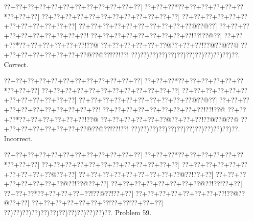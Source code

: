 \documentclass[a5paper]{article}
\begin{document}
\begin{center}
{\goo
\0??+\0??+\0??+\0??+\0??+\0??+\0??+\0??+\0??+\0??+\0??+\0??]
\0??+\0??+\0??*\0??+\0??+\0??+\0??+\0??+\0??*\0??+\0??+\0??]
\0??+\0??+\0??+\0??+\0??+\0??+\0??+\0??+\0??+\0??+\0??+\0??]
\0??+\0??+\0??+\0??+\0??+\0??+\0??+\0??+\0??+\0??+\0??+\0??]
\0??+\0??+\0??+\0??+\0??+\0??+\0??+\0??+\0??+\0??@\0??@\0??]
\0??+\0??+\0??+\0??+\0??+\0??+\0??+\0??+\0??+\0??!
\0??+\0??+\0??+\0??+\0??+\0??+\0??+\0??+\0??!\0??!\0??@\0??]
\0??+\0??+\0??*\0??+\0??+\0??+\0??+\0??+\0??!\0??@
\0??+\0??+\0??+\0??+\0??+\0??@\0??+\0??+\0??!\0??@\0??@\0??@
\0??+\0??+\0??+\0??+\0??+\0??+\0??+\0??@\0??@\0??!\0??!\0??!
\0??)\0??)\0??)\0??)\0??)\0??)\0??)\0??)\0??)\0??)\0??)\0??.
}
Correct. 

\end{center}
\begin{center}
{\goo
\0??+\0??+\0??+\0??+\0??+\0??+\0??+\0??+\0??+\0??+\0??+\0??]
\0??+\0??+\0??*\0??+\0??+\0??+\0??+\0??+\0??*\0??+\0??+\0??]
\0??+\0??+\0??+\0??+\0??+\0??+\0??+\0??+\0??+\0??+\0??+\0??]
\0??+\0??+\0??+\0??+\0??+\0??+\0??+\0??+\0??+\0??+\0??+\0??]
\0??+\0??+\0??+\0??+\0??+\0??+\0??+\0??+\0??+\0??@\0??@\0??]
\0??+\0??+\0??+\0??+\0??+\0??+\0??+\0??+\0??+\0??+\0??!
\0??+\0??+\0??+\0??+\0??+\0??+\0??+\0??+\0??!\0??!\0??@
\0??+\0??+\0??*\0??+\0??+\0??+\0??+\0??+\0??!\0??@
\0??+\0??+\0??+\0??+\0??+\0??@\0??+\0??+\0??!\0??@\0??@\0??@
\0??+\0??+\0??+\0??+\0??+\0??+\0??+\0??@\0??@\0??!\0??!\0??!
\0??)\0??)\0??)\0??)\0??)\0??)\0??)\0??)\0??)\0??)\0??)\0??.
}
Incorrect. 

\end{center}
\newpage
\begin{center}
{\goo
\0??+\0??+\0??+\0??+\0??+\0??+\0??+\0??+\0??+\0??+\0??+\0??]
\0??+\0??+\0??*\0??+\0??+\0??+\0??+\0??+\0??*\0??+\0??+\0??]
\0??+\0??+\0??+\0??+\0??+\0??+\0??+\0??+\0??+\0??+\0??+\0??]
\0??+\0??+\0??+\0??+\0??+\0??+\0??+\0??+\0??+\0??@\0??+\0??]
\0??+\0??+\0??+\0??+\0??+\0??+\0??+\0??+\0??@\0??!\0??+\0??]
\0??+\0??+\0??+\0??+\0??+\0??+\0??+\0??@\0??!\0??@\0??+\0??]
\0??+\0??+\0??+\0??+\0??+\0??+\0??+\0??@\0??!\0??!\0??+\0??]
\0??+\0??+\0??*\0??+\0??+\0??+\0??+\0??!\0??@\0??!\0??+\0??]
\0??+\0??+\0??+\0??+\0??+\0??+\0??+\0??!\0??@\0??@\0??+\0??]
\0??+\0??+\0??+\0??+\0??+\0??+\0??!\0??+\0??!\0??+\0??+\0??]
\0??)\0??)\0??)\0??)\0??)\0??)\0??)\0??)\0??)\0??)\0??)\0??.
}
Problem 59.

\end{center}
\end{document}
